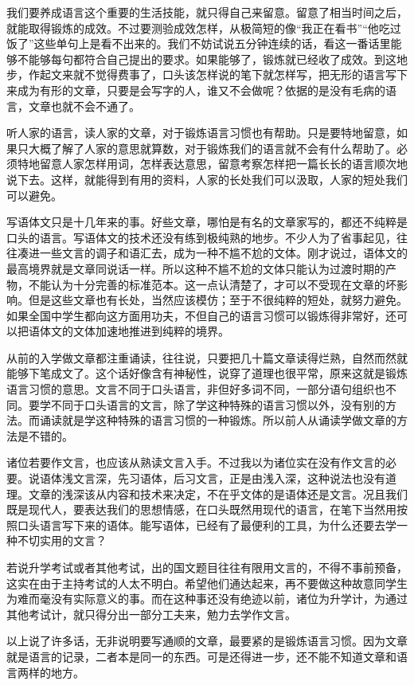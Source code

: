 \documentclass[fontset=fandol,12pt,a5paper]{ctexbook}
\begin{document}
我们要养成语言这个重要的生活技能，就只得自己来留意。留意了相当时间之后，就能取得锻炼的成效。不过要测验成效怎样，从极简短的像“我正在看书”“他吃过饭了”这些单句上是看不出来的。我们不妨试说五分钟连续的话，看这一番话里能够不能够每句都符合自己提出的要求。如果能够了，锻炼就已经收了成效。到这地步，作起文来就不觉得费事了，口头该怎样说的笔下就怎样写，把无形的语言写下来成为有形的文章，只要是会写字的人，谁又不会做呢？依据的是没有毛病的语言，文章也就不会不通了。

听人家的语言，读人家的文章，对于锻炼语言习惯也有帮助。只是要特地留意，如果只大概了解了人家的意思就算数，对于锻炼我们的语言就不会有什么帮助了。必须特地留意人家怎样用词，怎样表达意思，留意考察怎样把一篇长长的语言顺次地说下去。这样，就能得到有用的资料，人家的长处我们可以汲取，人家的短处我们可以避免。

写语体文只是十几年来的事。好些文章，哪怕是有名的文章家写的，都还不纯粹是口头的语言。写语体文的技术还没有练到极纯熟的地步。不少人为了省事起见，往往凑进一些文言的调子和语汇去，成为一种不尴不尬的文体。刚才说过，语体文的最高境界就是文章同说话一样。所以这种不尴不尬的文体只能认为过渡时期的产物，不能认为十分完善的标准范本。这一点认清楚了，才可以不受现在文章的坏影响。但是这些文章也有长处，当然应该模仿；至于不很纯粹的短处，就努力避免。如果全国中学生都向这方面用功夫，不但自己的语言习惯可以锻炼得非常好，还可以把语体文的文体加速地推进到纯粹的境界。

从前的入学做文章都注重诵读，往往说，只要把几十篇文章读得烂熟，自然而然就能够下笔成文了。这个话好像含有神秘性，说穿了道理也很平常，原来这就是锻炼语言习惯的意思。文言不同于口头语言，非但好多词不同，一部分语句组织也不同。要学不同于口头语言的文言，除了学这种特殊的语言习惯以外，没有别的方法。而诵读就是学这种特殊的语言习惯的一种锻炼。所以前人从诵读学做文章的方法是不错的。

诸位若要作文言，也应该从熟读文言入手。不过我以为诸位实在没有作文言的必要。说语体浅文言深，先习语体，后习文言，正是由浅入深，这种说法也没有道理。文章的浅深该从内容和技术来决定，不在乎文体的是语体还是文言。况且我们既是现代人，要表达我们的思想情感，在口头既然用现代的语言，在笔下当然用按照口头语言写下来的语体。能写语体，已经有了最便利的工具，为什么还要去学一种不切实用的文言？

若说升学考试或者其他考试，出的国文题目往往有限用文言的，不得不事前预备，这实在由于主持考试的人太不明白。希望他们通达起来，再不要做这种故意同学生为难而毫没有实际意义的事。而在这种事还没有绝迹以前，诸位为升学计，为通过其他考试计，就只得分出一部分工夫来，勉力去学作文言。

以上说了许多话，无非说明要写通顺的文章，最要紧的是锻炼语言习惯。因为文章就是语言的记录，二者本是同一的东西。可是还得进一步，还不能不知道文章和语言两样的地方。
\end{document}
